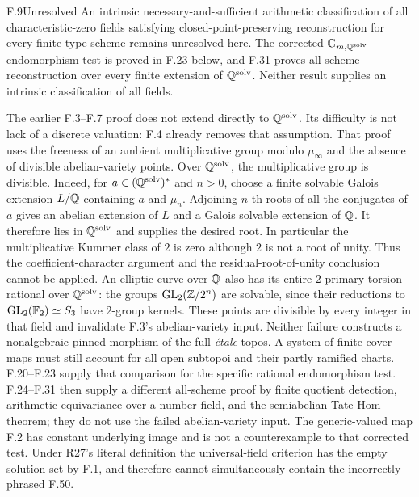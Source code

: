 \begin{claim}{F.9}{Unresolved}
An intrinsic necessary-and-sufficient arithmetic classification of
all characteristic-zero fields satisfying closed-point-preserving
reconstruction for every finite-type scheme remains unresolved here.
The corrected $\mathbb G_{m,\mathbb Q^{\mathrm{solv}}}$ endomorphism
test is proved in F.23 below, and F.31 proves all-scheme
reconstruction over every finite extension of $\mathbb Q^{\mathrm{solv}}$.
Neither result supplies an intrinsic classification of all fields.
\end{claim}
The earlier F.3--F.7 proof does not extend directly to
$\mathbb Q^{\mathrm{solv}}$. Its difficulty is not lack of a discrete
valuation: F.4 already removes that assumption. That proof uses the
freeness of an ambient multiplicative group modulo $\mu_\infty$
and the absence of divisible abelian-variety points. Over
$\mathbb Q^{\mathrm{solv}}$, the multiplicative group is divisible.
Indeed, for $a\in(\mathbb Q^{\mathrm{solv}})^*$ and $n>0$, choose
a finite solvable Galois extension $L/\mathbb Q$ containing $a$ and
$\mu_n$. Adjoining $n$-th roots of all the conjugates of $a$
gives an abelian extension of $L$ and a Galois solvable extension
of $\mathbb Q$. It therefore lies in $\mathbb Q^{\mathrm{solv}}$ and supplies
the desired root. In particular the multiplicative Kummer class
of $2$ is zero although $2$ is not a root of unity.
Thus the coefficient-character argument and
the residual-root-of-unity conclusion cannot be applied. An elliptic
curve over $\mathbb Q$ also has its entire $2$-primary torsion rational
over $\mathbb Q^{\mathrm{solv}}$: the groups
$\operatorname{GL}_2(\mathbb Z/2^n)$ are solvable, since their reductions
to $\operatorname{GL}_2(\mathbb F_2)\simeq S_3$ have $2$-group kernels.
These points are divisible by every integer in that field and
invalidate F.3's abelian-variety input. Neither failure constructs
a nonalgebraic pinned morphism of the full \emph{\'etale} topos.
A system of finite-cover maps must still account for all open
subtopoi and their partly ramified charts. F.20--F.23 supply that
comparison for the specific rational endomorphism test.
F.24--F.31 then supply a different all-scheme proof by finite
quotient detection, arithmetic equivariance over a number field,
and the semiabelian Tate-Hom theorem; they do not use the failed
abelian-variety input. The generic-valued map
F.2 has constant underlying image and is not a counterexample
to that corrected test. Under R27's literal definition the universal-field
criterion has the empty solution set by F.1, and therefore cannot
simultaneously contain the incorrectly phrased F.50.

